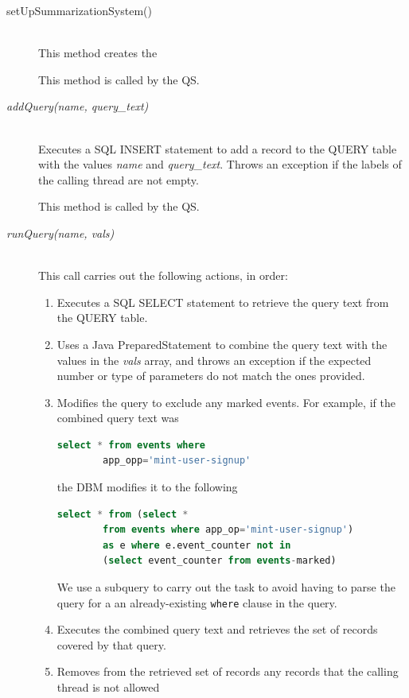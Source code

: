 \begin{description}
  \item[setUpSummarizationSystem()] \ \\
    This method creates the 

    This method is called by the QS.
  \item[\emph{addQuery(name, query\_text)}] \ \\
    Executes a SQL INSERT statement to add a record
    to the QUERY table with the values \emph{name}
    and \emph{query\_text}.
    Throws an exception if the labels of the 
    calling thread are not empty.

    This method is called by the QS.
  \item[\emph{runQuery(name, vals)}] \ \\
    This call carries out the following actions,
    in order:
    \begin{enumerate}
      \item Executes a SQL SELECT statement to retrieve 
        the query text from the QUERY table.
      \item Uses a Java PreparedStatement to combine
        the query text with the values in the 
        \emph{vals} array,
        and throws an exception if the expected
        number or type of parameters do not match
        the ones provided.
      \item Modifies the query to exclude any marked events.
        For example, if the combined query text was 
        \begin{lstlisting}[language=SQL]
        select * from events where 
        app_opp='mint-user-signup'
        \end{lstlisting}
        the DBM modifies it to the following
        \begin{lstlisting}[language=SQL]
        select * from (select * 
        from events where app_op='mint-user-signup') 
        as e where e.event_counter not in 
        (select event_counter from events-marked)
        \end{lstlisting}
        We use a subquery to carry out the task to avoid
        having to parse the query for a an already-existing
        \lstinline$where$ clause in the query.
      \item Executes the combined query text and
        retrieves the set of records covered by that query.
      \item Removes from the retrieved set of records
        any records that
        the calling thread is not allowed

\end{enumerate}
\end{description}
